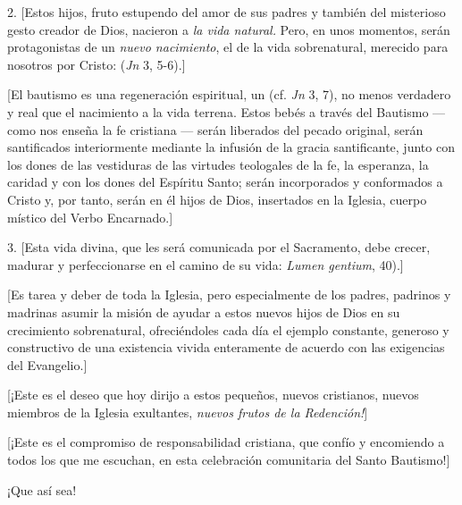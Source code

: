 \begin{body}
					2. {[}Estos hijos, fruto estupendo del amor de sus padres y también del misterioso gesto creador de Dios, nacieron a \emph{la vida natural.} Pero, en unos momentos, serán protagonistas de un \emph{nuevo nacimiento}, el de la vida sobrenatural, merecido para nosotros por Cristo:  (\emph{Jn} 3, 5-6).{]}
					
					{[}El bautismo es una regeneración espiritual, un  (cf. \emph{Jn} 3, 7), no menos verdadero y real que el nacimiento a la vida terrena. Estos bebés a través del Bautismo --- como nos enseña la fe cristiana --- serán liberados del pecado original, serán santificados interiormente mediante la infusión de la gracia santificante, junto con los dones de las vestiduras de las virtudes teologales de la fe, la esperanza, la caridad y con los dones del Espíritu Santo; serán incorporados y conformados a Cristo y, por tanto, serán en él hijos de Dios, insertados en la Iglesia, cuerpo místico del Verbo Encarnado.{]}
					
					3. {[}Esta vida divina, que les será comunicada por el Sacramento, debe crecer, madurar y perfeccionarse en el camino de su vida:  \emph{Lumen gentium}, 40).{]}
					
					{[}Es tarea y deber de toda la Iglesia, pero especialmente de los padres, padrinos y madrinas asumir la misión de ayudar a estos nuevos hijos de Dios en su crecimiento sobrenatural, ofreciéndoles cada día el ejemplo constante, generoso y constructivo de una existencia vivida enteramente de acuerdo con las exigencias del Evangelio.{]}
					
					{[}¡Este es el deseo que hoy dirijo a estos pequeños, nuevos cristianos, nuevos miembros de la Iglesia exultantes, \emph{nuevos frutos de la Redención!}{]}
					
					{[}¡Este es el compromiso de responsabilidad cristiana, que confío y encomiendo a todos los que me escuchan, en esta celebración comunitaria del Santo Bautismo!{]}
					
					¡Que así sea!
				\end{body}
			
